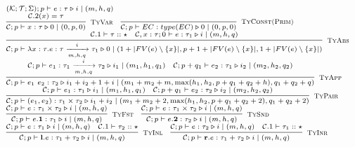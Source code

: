 \documentclass[fleqn]{article}
\begin{document}
\[
\scriptsize
\begin{array}{l}
	(\mathcal{K}; \mathcal{T}; \Sigma);p \vdash e : \tau \triangleright i \mid (m, h, q) \\
	
	\infer[\textsc{TyVar}]{\jtygc{\mathcal{C};p}{x}{\tau}{0}{0}{p}{0}}{\mathcal{C}.2(x)=\tau} \hspace{1em}
	
	\infer[\textsc{TyConst(Prim)}]{\jtygc{\mathcal{C};p}{EC}{type(EC)}{0}{0}{p}{0}}{} \\
	
	\infer[\textsc{TyAbs}]{\jtygc{ \mathcal{C};p}{ \lambda x:\tau. e}{ \tau \xrightarrow[m,h,q]{i} \tau_1 }{ 0 }{ 1 + |FV(e)\setminus \{ x \}| }{p + 1 + |FV(e)\setminus\{x\}|}{1 + |FV(e) \setminus \{x\}|} }{\mathcal{C}.1 \vdash \tau :: \star & \jtygc{\mathcal{C},x:\tau; 0}{ e }{ \tau_1 }{ i }{ m }{h}{q}} \\
	
	\infer[\textsc{TyApp}]{\jtygc{\mathcal{C};p} { e_1~e_2 } { \tau_2 } { i_1 + i_2 + 1 + i } { m_1 + m_2 + m }{ \max(h_1,h_2,p+q_1+q_2+h) }{q_1+q_2+q} }{\jtygc{\mathcal{C};p} { e_1 }{ \tau_1 \xrightarrow[m,h,q]{i} \tau_2 }{ i_1 }{ m_1 }{h_1}{q_1} & \jtygc{\mathcal{C};p+q_1 } { e_2 }{ \tau_1 }{ i_2 }{ m_2}{h_2}{q_2}} \\
	
	\infer[\textsc{TyPair}]{\jtygc{\mathcal{C};p}{ (e_1,e_2) }{ \tau_1 \times \tau_2 }{ i_1 + i_2 }{ m_1 + m_2 + 2}{\max(h_1,h_2,p+q_1+q_2+2)}{q_1+q_2+2} }{\jtygc{\mathcal{C};p}{  e_1 }{ \tau_1 }{ i_1 }{m_1}{h_1}{q_1} & \jtygc{\mathcal{C};p+q_1 }{ e_2 }{ \tau_2 }{ i_2 }{ m_2}{h_2}{q_2} } \\
	
	\infer[\textsc{TyFst}]{\jtygc{\mathcal{C};p }{ e.\mathbf{1} }{ \tau_1 }{ i }{ m}{h}{q} }{\jtygc{\mathcal{C};p }{ e }{ \tau_1 \times \tau_2 }{ i }{ m}{h}{q} } \hspace{1em}
	
	\infer[\textsc{TySnd}]{\jtygc{\mathcal{C};p }{ e.\mathbf{2} }{ \tau_2 }{ i }{ m}{h}{q} }{\jtygc{\mathcal{C};p }{ e }{ \tau_1 \times \tau_2 }{ i }{ m}{h}{q} } \\
	
	\infer[\textsc{TyInl}]{\jtygc{\mathcal{C};p }{ \mathbf{l}.e }{ \tau_1 + \tau_2 }{ i }{ m}{h}{q}}{\jtygc{\mathcal{C};p }{ e }{ \tau_1 }{ i }{ m }{h}{q} & \mathcal{C}.1 \vdash \tau_2 :: \star} \hspace{1em}
	
	\infer[\textsc{TyInr}]{\jtygc{\mathcal{C};p }{ \mathbf{r}.e }{ \tau_1 + \tau_2 }{ i }{ m}{h}{q}}{\jtygc{\mathcal{C};p }{ e }{ \tau_2 }{ i }{ m }{h}{q} & \mathcal{C}.1 \vdash \tau_1 :: \star} \\
	

\end{array}\]
\end{document}
